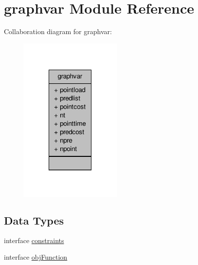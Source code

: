 \hypertarget{classgraphvar}{\section{graphvar Module Reference}
\label{classgraphvar}
}


Collaboration diagram for graphvar\-:\nopagebreak
\begin{figure}[H]
\begin{center}
\leavevmode
\includegraphics[width=144pt]{classgraphvar__coll__graph}
\end{center}
\end{figure}
\subsection*{Data Types}
\begin{DoxyCompactItemize}
\item 
interface \hyperlink{interfacegraphvar_1_1constraints}{constraints}
\item 
interface \hyperlink{interfacegraphvar_1_1obj_function}{obj\-Function}
\end{DoxyCompactItemize}
